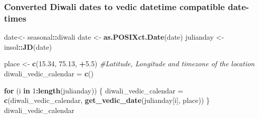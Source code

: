 \documentclass[
]{article}
\newenvironment{Shaded}{\begin{snugshade}}{\end{snugshade}}
\newcommand{\CommentTok}[1]{\textcolor[rgb]{0.56,0.35,0.01}{\textit{#1}}}
\newcommand{\ControlFlowTok}[1]{\textcolor[rgb]{0.13,0.29,0.53}{\textbf{#1}}}
\newcommand{\DecValTok}[1]{\textcolor[rgb]{0.00,0.00,0.81}{#1}}
\newcommand{\FloatTok}[1]{\textcolor[rgb]{0.00,0.00,0.81}{#1}}
\newcommand{\FunctionTok}[1]{\textcolor[rgb]{0.13,0.29,0.53}{\textbf{#1}}}
\newcommand{\NormalTok}[1]{#1}
\newcommand{\OtherTok}[1]{\textcolor[rgb]{0.56,0.35,0.01}{#1}}
\newcommand{\SpecialCharTok}[1]{\textcolor[rgb]{0.81,0.36,0.00}{\textbf{#1}}}
\begin{document}
\hypertarget{converted-diwali-dates-to-vedic-datetime-compatible-date-times}{%
\subsubsection{Converted Diwali dates to vedic datetime compatible
date-times}\label{converted-diwali-dates-to-vedic-datetime-compatible-date-times}}

\begin{Shaded}
\begin{Highlighting}[]
\NormalTok{date}\OtherTok{\textless{}{-}}\NormalTok{ seasonal}\SpecialCharTok{::}\NormalTok{diwali}
\NormalTok{date }\OtherTok{\textless{}{-}} \FunctionTok{as.POSIXct.Date}\NormalTok{(date)}
\NormalTok{julianday }\OtherTok{\textless{}{-}}\NormalTok{ insol}\SpecialCharTok{::}\FunctionTok{JD}\NormalTok{(date)}


\NormalTok{place }\OtherTok{\textless{}{-}} \FunctionTok{c}\NormalTok{(}\FloatTok{15.34}\NormalTok{, }\FloatTok{75.13}\NormalTok{, }\SpecialCharTok{+}\FloatTok{5.5}\NormalTok{) }\CommentTok{\#Latitude, Longitude and timezone of the location}
\NormalTok{diwali\_vedic\_calendar }\OtherTok{=} \FunctionTok{c}\NormalTok{()}

\ControlFlowTok{for}\NormalTok{ (i }\ControlFlowTok{in} \DecValTok{1}\SpecialCharTok{:}\FunctionTok{length}\NormalTok{(julianday)) }
\NormalTok{\{}
\NormalTok{  diwali\_vedic\_calendar }\OtherTok{=} \FunctionTok{c}\NormalTok{(diwali\_vedic\_calendar, }\FunctionTok{get\_vedic\_date}\NormalTok{(julianday[i], place))}
\NormalTok{\}}
\NormalTok{diwali\_vedic\_calendar}
\end{Highlighting}
\end{Shaded}
\end{document}
